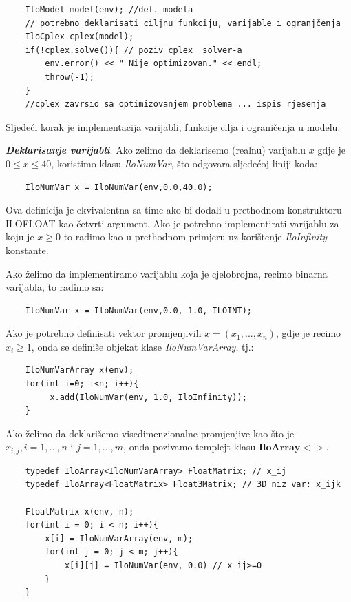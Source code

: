 \documentclass[a4paper, utf8, 11pt, colorlinks]{article}
\begin{document}
 \begin{verbatim}
 	IloModel model(env); //def. modela
 	// potrebno deklarisati ciljnu funkciju, varijable i ogranjčenja
 	IloCplex cplex(model);
 	if(!cplex.solve()){ // poziv cplex  solver-a
 		env.error() << " Nije optimizovan." << endl;
 		throw(-1);
 	}
 	//cplex zavrsio sa optimizovanjem problema ... ispis rjesenja
 \end{verbatim}
 
 \noindent Sljedeći korak je implementacija varijabli, funkcije cilja i ograničenja u modelu. 
 
 \noindent \textbf{\emph{Deklarisanje varijabli}}. Ako zelimo da deklarisemo (realnu) varijablu $x$ gdje je $0 \leq x \leq 40$, koristimo klasu \emph{IloNumVar}, što odgovara sljedećoj liniji koda:
 \begin{verbatim}
 	IloNumVar x = IloNumVar(env,0.0,40.0);
 \end{verbatim}
 Ova definicija je ekvivalentna sa time ako bi dodali u prethodnom konstruktoru ILOFLOAT kao četvrti argument. 
Ako je potrebno implementirati varijablu za koju je $x \geq 0$ to radimo kao u prethodnom primjeru uz korištenje  \emph{IloInfinity} konstante.
 
 Ako želimo da implementiramo varijablu koja je cjelobrojna, recimo binarna varijabla, to radimo sa:
 \begin{verbatim}
 	IloNumVar x = IloNumVar(env,0.0, 1.0, ILOINT);
 \end{verbatim}
 
 \noindent Ako je potrebno definisati vektor promjenjivih $x=(x_1,...,x_n)$, gdje je recimo $x_i \geq 1$, onda se definiše objekat klase \emph{IloNumVarArray}, tj.:
 \begin{verbatim}
 	IloNumVarArray x(env);
 	for(int i=0; i<n; i++){
 		 x.add(IloNumVar(env, 1.0, IloInfinity));
 	}
 \end{verbatim}
 
 \noindent Ako želimo da deklarišemo visedimenzionalne promjenjive kao što je $x_{i,j}, i=1,...,n$ i $j=1,...,m$, onda pozivamo templejt klasu $\textbf{IloArray}<>$.
 
 \begin{verbatim}
 	typedef IloArray<IloNumVarArray> FloatMatrix; // x_ij 
 	typedef IloArray<FloatMatrix> Float3Matrix; // 3D niz var: x_ijk
 	
 	FloatMatrix x(env, n);
 	for(int i = 0; i < n; i++){
 		x[i] = IloNumVarArray(env, m);
 		for(int j = 0; j < m; j++){
 			x[i][j] = IloNumVar(env, 0.0) // x_ij>=0
 		}
 	}
 \end{verbatim}
 
\end{document}
